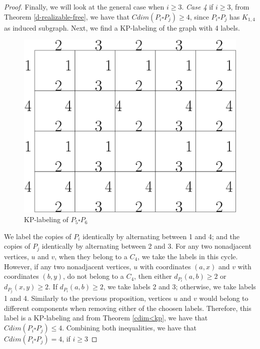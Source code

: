 \documentclass[12pt,a4paper,titlepage,openany]{report}
\begin{document}
\begin{proof}
Finally, we will look at the general case when $i\geq 3$.
\newline
\textit{Case 4} if $i\geq 3$, from Theorem \ref{d-realizable-free}, we have that $Cdim(P_i\square P_j)\geq 4$, since $P_i \square P_j$ has $K_{1,4}$ as induced subgraph.\newline
Next, we find a KP-labeling of the graph with 4 labels.
\begin{figure}[h]
\begin{center}
\includegraphics[width=1\linewidth]{figures/p_isqp_j.png}
\end{center}
\caption{KP-labeling of $P_5\square P_6$}
\end{figure}\newline
We label the copies of $P_i$ identically by alternating between 1 and 4; and the copies of $P_j$ identically by alternating between 2 and 3.\newline
For any two nonadjacent vertices, $u$ and $v$, when they belong to a $C_4$, we take the labels in this cycle. However, if any two nonadjacent vertices, $u$ with coordinates $(a,x)$ and $v$ with coordinates $(b,y)$, do not belong to a $C_4$, then either $d_{P_i}(a,b) \geq 2$ or $d_{P_j}(x,y) \ge 2$. If $d_{P_i}(a,b) \geq 2$, we take labels 2 and 3; otherwise, we take labels 1 and 4. Similarly to the previous proposition, vertices $u$ and $v$ would belong to different components when removing either of the choosen labels. 
 \newline
Therefore, this label is a KP-labeling and from Theorem \ref{cdim<kp}, we have that $Cdim(P_i\square P_j)\leq 4$.\newline
Combining both inequalities, we have that $Cdim(P_i\square P_j)=4$, if $i\geq 3$
\end{proof}
\end{document}
